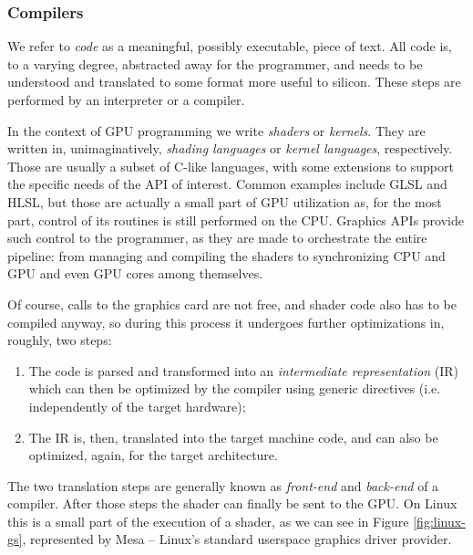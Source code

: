 \documentclass[conference, onecolumn]{IEEEtran}
\begin{document}
\subsubsection{Compilers} \label{sec:proposal:compilers}

We refer to \textit{code} as a meaningful, possibly executable, piece of text.
All code is, to a varying degree, abstracted away for the programmer, and needs
to be understood and translated to some format more useful to silicon.
These steps are performed by an interpreter or a compiler.

In the context of GPU programming we write \textit{shaders} or \textit{kernels}.
They are written in, unimaginatively, \textit{shading languages} or
\textit{kernel languages}, respectively.
Those are usually a subset of C-like languages, with some extensions to support
the specific needs of the API of interest.
Common examples include GLSL and HLSL, but those are actually a small part of
GPU utilization as, for the most part, control of its routines is still
performed on the CPU.
Graphics APIs provide such control to the programmer, as they are made to
orchestrate the entire pipeline: from managing and compiling the shaders to
synchronizing CPU and GPU and even GPU cores among themselves.

Of course, calls to the graphics card are not free, and shader code also has to
be compiled anyway, so during this process it undergoes further optimizations
in, roughly, two steps:
\begin{enumerate}
    \item The code is parsed and transformed into an \textit{intermediate
        representation} (IR) which can then be optimized by the compiler using
        generic directives (i.e. independently of the target hardware);
    \item The IR is, then, translated into the target machine code, and can
        also be optimized, again, for the target architecture.
\end{enumerate}
The two translation steps are generally known as \textit{front-end} and
\textit{back-end} of a compiler. After those steps the shader can finally be
sent to the GPU.
On Linux this is a small part of the execution of a shader, as we can see in
Figure \cref{fig:linux-gs}, represented by Mesa -- Linux's standard userspace
graphics driver provider.
\end{document}
